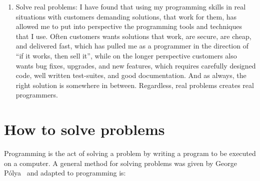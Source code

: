 \begin{enumerate}
\item Solve real problems: I have found that using my programming skills in real situations with customers demanding solutions, that work for them, has allowed me to put into perspective the programming tools and techniques that I use. Often customers wants solutions that work, are secure, are cheap, and delivered fast, which has pulled me as a programmer in the direction of ``if it works, then sell it'', while on the longer perspective customers also wants bug fixes, upgrades, and new features, which requires carefully designed code, well written test-suites, and good documentation. And as always, the right solution is somewhere in between. Regardless, real problems creates real programmers.
\end{enumerate}

\section{How to solve problems}
Programming is the act of solving a problem by writing a program to be executed on a computer. A general method for solving problems was given by George Pólya~\cite{polya45} and adapted to programming is:
